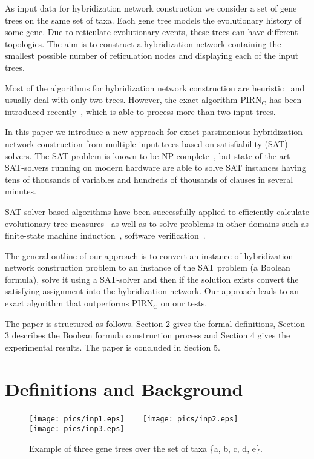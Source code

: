 \documentclass[runningheads, envcountsame, a4paper]{llncs}
\begin{document}
As input data for hybridization network construction we consider a set of gene trees on the same set of taxa.
Each gene tree models the evolutionary history of some gene. 
Due to reticulate evolutionary events, these trees can have different topologies.
The aim is to construct a hybridization network containing the smallest possible number of 
reticulation nodes and displaying each of the input trees. 

Most of the algorithms for hybridization network construction are heuristic~\cite{wu2013algorithm, park2012murpar} 
and usually deal with only two trees.
However, the exact algorithm PIRN$_\mathrm{C}$ has been introduced recently~\cite{wu2013algorithm}, which is able to process more than two input trees.

In this paper we introduce a new approach for exact parsimonious
hybridization network construction from multiple input trees based on satisfiability (SAT) solvers.
The SAT problem is known to be NP-complete~\cite{bordewich2007computing}, but state-of-the-art SAT-solvers running on modern hardware 
are able to solve SAT instances having tens of thousands of variables and hundreds of thousands of clauses in several minutes.

SAT-solver based algorithms have been successfully applied to efficiently calculate evolutionary tree measures~\cite{bonet2009efficiently}
as well as to solve problems in other domains such as
finite-state machine induction~\cite{heule2010exact}, software verification~\cite{biere2003bounded}.

The general outline of our approach is to convert an instance of hybridization network construction 
problem to an instance of the SAT problem (a Boolean formula), solve it using a SAT-solver and then if the
solution exists convert 
the satisfying assignment into the hybridization network.
Our approach leads to an exact algorithm that outperforms PIRN$\mathrm{_C}$ on our tests.

The paper is structured as follows. Section 2 gives the formal definitions, Section 3 describes the Boolean formula
construction process and Section 4 gives the experimental results. The paper is concluded in Section 5.

\section{Definitions and Background}

\begin{figure}[t]
  \centering
  \texttt{[image: pics/inp1.eps]}
  ~~~
  \texttt{[image: pics/inp2.eps]}
  ~~~
  \texttt{[image: pics/inp3.eps]}
  \caption{Example of three gene trees over the set of taxa \{a, b, c, d, e\}.}
  \label{input-example}
\end{figure}
\end{document}
